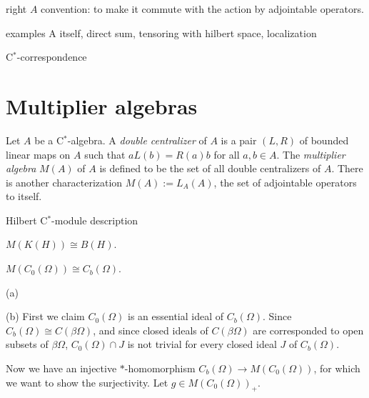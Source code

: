 \documentclass{../../large}
\begin{document}
right $A$ convention: to make it commute with the action by adjointable operators.

examples
A itself, direct sum, tensoring with hilbert space, localization

C$^*$-correspondence

\section{Multiplier algebras}
\begin{prb}
Let $A$ be a C$^*$-algebra.
A \emph{double centralizer} of $A$ is a pair $(L,R)$ of bounded linear maps on $A$ such that $aL(b)=R(a)b$ for all $a,b\in A$.
The \emph{multiplier algebra} $M(A)$ of $A$ is defined to be the set of all double centralizers of $A$.
There is another characterization $M(A):=L_A(A)$, the set of adjointable operators to itself.
\end{prb}
\begin{prb}
\end{prb}
\begin{prb}
\end{prb}
\begin{prb}
\begin{parts}
\item Hilbert C$^*$-module description
\end{parts}
\end{prb}


\begin{prb}
\begin{parts}
\item $M(K(H))\cong B(H)$.
\item $M(C_0(\Omega))\cong C_b(\Omega)$.
\end{parts}
\end{prb}
\begin{pf}
(a)

(b)
First we claim $C_0(\Omega)$ is an essential ideal of $C_b(\Omega)$.
Since $C_b(\Omega)\cong C(\beta\Omega)$, and since closed ideals of $C(\beta\Omega)$ are corresponded to open subsets of $\beta\Omega$, $C_0(\Omega)\cap J$ is not trivial for every closed ideal $J$ of $C_b(\Omega)$.

Now we have an injective $*$-homomorphism $C_b(\Omega)\to M(C_0(\Omega))$, for which we want to show the surjectivity.
Let $g\in M(C_0(\Omega))_+$.
\end{pf}
\end{document}
